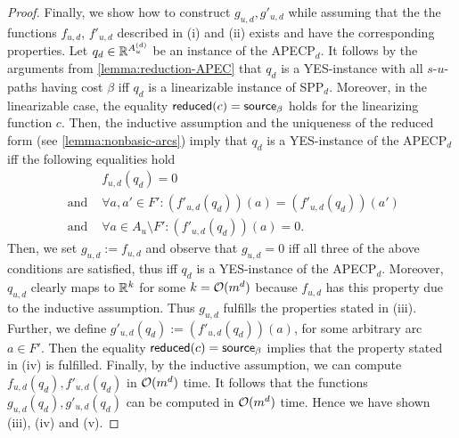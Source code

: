 \begin{proof}
    Finally, we show how to construct $g_{u,d}, g'_{u,d}$ while assuming that the the functions $f_{u,d}$, $f'_{u,d}$ described in (i) and (ii) exists and have the corresponding properties. Let $q_d \in \mathbb{R}^{A_u^{(d)}}$ be an instance of the APECP$_d$. It follows by the arguments from \cref{lemma:reduction-APEC} that $q_d$ is a YES-instance with all $s$-$u$-paths having cost $\beta$ iff $q_d$ is a linearizable instance of SPP$_d$. Moreover,  in the linearizable case, the equality $\operatorname{\textsf{reduced}}(c) = \textsf{source}_\beta$ holds for the linearizing function $c$. Then,  the inductive assumption and the uniqueness of the reduced form
    (see \cref{lemma:nonbasic-arcs}) imply that $q_d$ is  a YES-instance of the APECP$_d$  iff the following equalities hold 
    \begin{align*}
        &f_{u,d}(q_d) = 0 \\
        \text{ and } &\forall a,a' \in F':  (f'_{u,d}(q_d))(a) = (f'_{u,d}(q_d))(a') \\
        \text{ and } &\forall a \in A_u \setminus F': (f'_{u,d}(q_d))(a) = 0. 
    \end{align*}
     Then, we set $g_{u,d}:=f_{u,d}$ and observe that $g_{u,d} = 0$ iff all three of the above conditions are satisfied, thus iff  $q_d$ is  a YES-instance of the APECP$_d$. 
    Moreover,  $q_{u,d}$ clearly  maps to  $\mathbb{R}^k$ for some $k = \mathcal{O}(m^d)$ because $f_{u,d}$ has this property due to the inductive assumption.   Thus $g_{u,d}$ fulfills the properties stated in (iii).  Further, we define $g'_{u,d}(q_d) := (f'_{u,d}(q_d))(a)$, for some arbitrary arc $a \in F'$. Then  the equality  $\operatorname{\textsf{reduced}}(c) = \textsf{source}_\beta$ implies that the property stated in (iv) is fulfilled.    Finally, by the inductive assumption, we can compute $f_{u,d}(q_d), f'_{u,d}(q_d)$ in $\mathcal{O}(m^d)$ time. It follows that the functions $g_{u,d}(q_d), g'_{u,d}(q_d)$ can be computed in $\mathcal{O}(m^d)$ time. Hence we have shown (iii),  (iv) and (v).
\end{proof}

